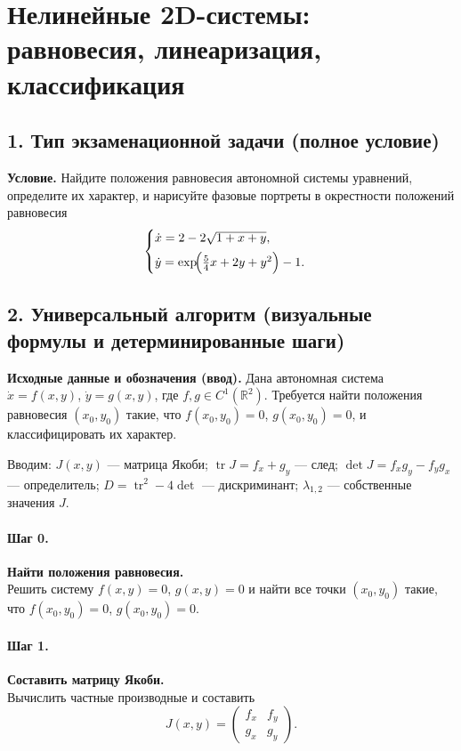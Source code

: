 \section{Нелинейные 2D-системы: равновесия, линеаризация, классификация}

\subsection*{1. Тип экзаменационной задачи (полное условие)}
\textbf{Условие.} Найдите положения равновесия автономной системы уравнений, определите их характер, и нарисуйте фазовые портреты в окрестности положений равновесия
\[
\begin{cases}
\dot{x}=2-2\sqrt{1+x+y},\\[4pt]
\dot{y}=\exp\!\Bigl(\tfrac{5}{4}x+2y+y^{2}\Bigr)-1.
\end{cases}
\]

\subsection*{2. Универсальный алгоритм (визуальные формулы и детерминированные шаги)}

\textbf{Исходные данные и обозначения (ввод).} Дана автономная система \(\dot{x}=f(x,y)\), \(\dot{y}=g(x,y)\), где \(f,g\in C^1(\mathbb{R}^2)\). Требуется найти положения равновесия \((x_0,y_0)\) такие, что \(f(x_0,y_0)=0\), \(g(x_0,y_0)=0\), и классифицировать их характер.

Вводим: \(J(x,y)\) — матрица Якоби; \(\operatorname{tr}J=f_x+g_y\) — след; \(\det J=f_x g_y-f_y g_x\) — определитель; \(D=\operatorname{tr}^2-4\det\) — дискриминант; \(\lambda_{1,2}\) — собственные значения \(J\).

\paragraph{Шаг 0.} \textbf{Найти положения равновесия.}\\
Решить систему \(f(x,y)=0\), \(g(x,y)=0\) и найти все точки \((x_0,y_0)\) такие, что \(f(x_0,y_0)=0\), \(g(x_0,y_0)=0\).

\paragraph{Шаг 1.} \textbf{Составить матрицу Якоби.}\\
Вычислить частные производные и составить
\[
J(x,y)=\begin{pmatrix} f_x & f_y\\[2pt] g_x & g_y \end{pmatrix}.
\]

